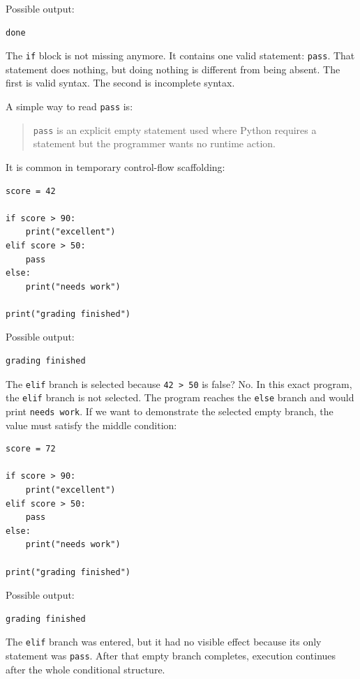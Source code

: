 Possible output:

\begin{verbatim}
done
\end{verbatim}

The \texttt{if} block is not missing anymore. It contains one valid statement: \texttt{pass}. That statement does nothing, but doing nothing is different from being absent. The first is valid syntax. The second is incomplete syntax.

A simple way to read \texttt{pass} is:

\begin{quote}
\texttt{pass} is an explicit empty statement used where Python requires a statement but the programmer wants no runtime action.
\end{quote}

It is common in temporary control-flow scaffolding:

\begin{verbatim}
score = 42

if score > 90:
    print("excellent")
elif score > 50:
    pass
else:
    print("needs work")

print("grading finished")
\end{verbatim}

Possible output:

\begin{verbatim}
grading finished
\end{verbatim}

The \texttt{elif} branch is selected because \texttt{42 > 50} is false? No. In this exact program, the \texttt{elif} branch is not selected. The program reaches the \texttt{else} branch and would print \texttt{needs work}. If we want to demonstrate the selected empty branch, the value must satisfy the middle condition:

\begin{verbatim}
score = 72

if score > 90:
    print("excellent")
elif score > 50:
    pass
else:
    print("needs work")

print("grading finished")
\end{verbatim}

Possible output:

\begin{verbatim}
grading finished
\end{verbatim}

The \texttt{elif} branch was entered, but it had no visible effect because its only statement was \texttt{pass}. After that empty branch completes, execution continues after the whole conditional structure.


